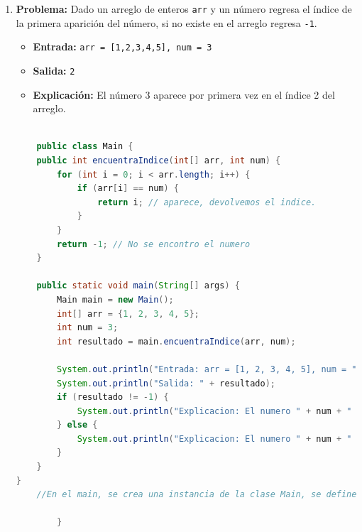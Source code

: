 \documentclass{article}
\begin{document}
\begin{enumerate}
\begin{lstlisting}[language=Java]
        System.out.println("Entrada: arr = [2, 5, 6, 9, 10]");
        System.out.println("Salida: " + resultado);
        System.out.println("Explicacion: El numero mas peque es 2, el numero mas grande es 10 y el MCD de 2 y 10 es 2.");
    }
}
        }
    \end{lstlisting}

    \item \textbf{Problema:} Dado un arreglo de enteros \texttt{arr} y un número
    regresa el índice de la primera aparición del número, si no existe en el 
    arreglo regresa \texttt{-1}.
    \begin{itemize}
        \item \textbf{Entrada:} \texttt{arr = [1,2,3,4,5], num = 3}
        \item \textbf{Salida:} \texttt{2}
        \item \textbf{Explicación:} El número 3 aparece por primera vez en el 
        índice 2 del arreglo.
    \end{itemize}
    \begin{lstlisting}[language=Java]
        
    public class Main {
    public int encuentraIndice(int[] arr, int num) {
        for (int i = 0; i < arr.length; i++) {
            if (arr[i] == num) {
                return i; // aparece, devolvemos el indice.
            }
        }
        return -1; // No se encontro el numero
    }

    public static void main(String[] args) {
        Main main = new Main();
        int[] arr = {1, 2, 3, 4, 5};
        int num = 3;
        int resultado = main.encuentraIndice(arr, num);

        System.out.println("Entrada: arr = [1, 2, 3, 4, 5], num = " + num);
        System.out.println("Salida: " + resultado);
        if (resultado != -1) {
            System.out.println("Explicacion: El numero " + num + " aparece por primera vez en el indice " + resultado + " del arreglo.");
        } else {
            System.out.println("Explicacion: El numero " + num + " no existe en el arreglo.");
        }
    }
}
    //En el main, se crea una instancia de la clase Main, se define el arreglo de entrada [1, 2, 3, 4, 5] y el nUM a buscar 3, se llama al metodo encuentraIndice y se imprime 

        }
    \end{lstlisting}
\end{enumerate}
\end{document}
